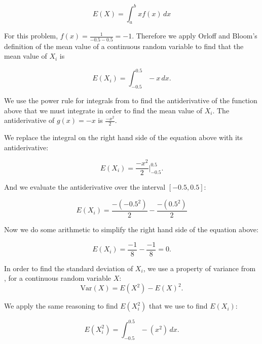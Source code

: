 \documentclass[a4paper,11pt]{article}
\begin{document}
\begin{equation}
  E\left(X \right) = \int_a^b xf\left(x \right) \,dx
\end{equation}

For this problem, $f\left( x \right) = \frac{1}{-0.5 - 0.5} = -1$.  Therefore
we apply Orloff and Bloom's definition of the mean value of a continuous random
variable to find that the mean value of $X_i$ is

\begin{equation}
  E\left(X_i \right) = \int_{-0.5}^{0.5}-x \,dx.
\end{equation}

We use the power rule for integrals from \cite{basicInt} to find the antiderivative
of the function above that we must integrate in order to find the mean value of
$X_i$.  The antiderivative of $g\left( x \right) = -x$ is $\frac{-x^2}{2}$.

We replace the integral on the right hand side of the equation above with its
antiderivative:

\begin{equation}
  E\left(X_i \right) = \frac{-x^2}{2} \bigg\rvert_{-0.5}^{0.5}.
\end{equation}

And we evaluate the antiderivative over the interval $\left[-0.5, 0.5 \right]$:


\begin{equation}
  E\left(X_i \right) = \frac{-\left(-0.5^2 \right)}{2} - \frac{-\left(0.5^2 \right)}{2}
\end{equation}

Now we do some arithmetic to simplify the right hand side of the equation above:

\begin{equation}
  E\left(X_i \right) = \frac{-1}{8} - \frac{-1}{8} = 0.
\end{equation}

In order to find the standard deviation of $X_i$, we use a property of variance
from \cite{reading6a}, for a continuous random variable $X$:
\begin{equation}
\text{Var}\left(X \right) = E\left(X^2 \right) - E\left(X \right)^2.
\end{equation}

We apply the same reasoning to find $E\left(X_i^2 \right)$ that we use to find
$E\left(X_i \right)$:

\begin{equation}
  E\left(X_i^2 \right) = \int_{-0.5}^{0.5}- \left(x^2 \right) \,dx.
\end{equation}
\end{document}
